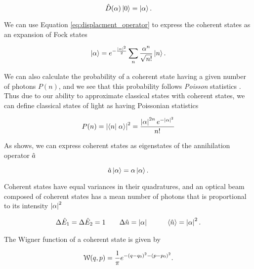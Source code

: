 \begin{equation}
  \label{eq:displaced_vacuum}
  \hat{D}(\alpha) \left| 0 \right> = \left| \alpha \right>.
\end{equation}

\noindent
We can use Equation \ref{eq:displacment_operator} to express the coherent states as an expansion of Fock states \cite{Glauber63} 

\begin{equation}
  \label{eq:coherent_fock_expansion}
  \left| \alpha \right> =  e^{-\frac{\left| \alpha \right|^2}{2}} \sum_n \frac{\alpha^n}{\sqrt{n!}} \left| n \right>.
\end{equation}
 
\noindent
We can also calculate the probability of a coherent state having a given number of photons $P(n)$, and we see that this probability follows \emph{Poisson} statistics \cite{fox2006quantum}.  Thus due to our ability to approximate classical states with coherent states, we can define classical states of light as having Poissonian statistics

\begin{equation}
  \label{eq:coherent_probability}
  P(n) = \abs{\braket{n}{\alpha}}^2 = \frac{\abs{\alpha}^{2n}e^{-\abs{\alpha}^2}}{n!}
\end{equation}

\noindent
As  shows, we can express coherent states as
eigenstates of the annihilation operator $\hat{a}$

\begin{equation}
  \label{eq:coherent_equation}
  \hat{a} \left| \alpha \right> = \alpha \left| \alpha  \right>.
\end{equation}

\noindent
Coherent states have equal variances in their quadratures, and an optical beam composed of coherent states has a mean number of photons that is proportional to its intensity $\left| \alpha \right|^2$

\begin{eqnarray}
  \label{eq:coherent_properties}
    \Delta \hat{E}_1 = \Delta \hat{E}_2 = 1   \quad & \quad \Delta \hat{n} =  \left| \alpha \right| \quad & \quad \left< \hat{n} \right> = \left| \alpha \right|^2.
\end{eqnarray}

\noindent
The Wigner function of a coherent state is given by 

\begin{equation}
  \label{eq:wigner_coherent}
  \mathcal{W}(q,p) = \frac{1}{\pi} e^{-(q-q_0)^2-(p-p_0)^2}.
\end{equation}


